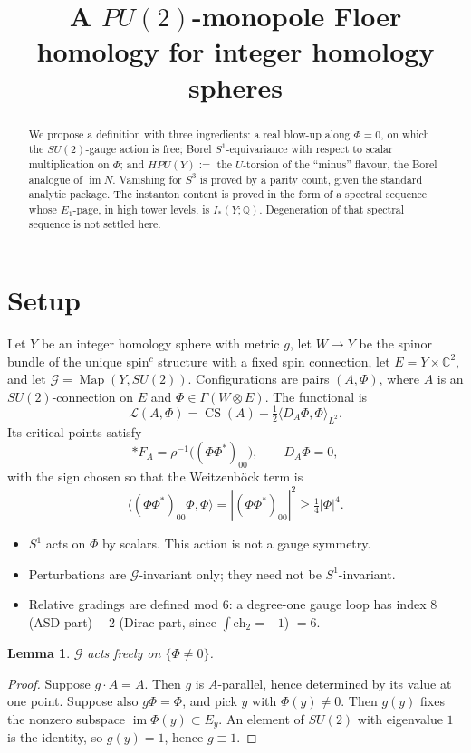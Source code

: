 \documentclass[11pt]{amsart}
\title{A $PU(2)$-monopole Floer homology for integer homology spheres}
\date{}
\newtheorem{lemma}{Lemma}
\theoremstyle{definition}
\theoremstyle{remark}
\newcommand{\Q}{\mathbb{Q}}
\newcommand{\C}{\mathbb{C}}
\newcommand{\cG}{\mathcal{G}}
\newcommand{\cL}{\mathcal{L}}
\newcommand{\HPU}{\mathit{HPU}}
\DeclareMathOperator{\CS}{CS}
\DeclareMathOperator{\im}{im}
\DeclareMathOperator{\Map}{Map}
\begin{document}
\begin{abstract}
We propose a definition with three ingredients: a real blow-up along
$\Phi=0$, on which the $SU(2)$-gauge action is free; Borel
$S^1$-equivariance with respect to scalar multiplication on $\Phi$; and
$\HPU(Y):=$ the $U$-torsion of the ``minus'' flavour, the Borel analogue
of $\im N$. Vanishing for $S^3$ is proved by a parity count, given the
standard analytic package. The instanton content is proved in the form of
a spectral sequence whose $E_1$-page, in high tower levels, is
$I_*(Y;\Q)$. Degeneration of that spectral sequence is not settled here.
\end{abstract}

\maketitle

\section{Setup}

Let $Y$ be an integer homology sphere with metric $g$, let $W\to Y$ be the
spinor bundle of the unique spin$^c$ structure with a fixed spin
connection, let $E=Y\times\C^2$, and let $\cG=\Map(Y,SU(2))$.
Configurations are pairs $(A,\Phi)$, where $A$ is an $SU(2)$-connection on
$E$ and $\Phi\in\Gamma(W\otimes E)$. The functional is
\[
\cL(A,\Phi)=\CS(A)+\tfrac12\langle D_A\Phi,\Phi\rangle_{L^2}.
\]
Its critical points satisfy
\[
\ast F_A=\rho^{-1}\big((\Phi\Phi^*)_{00}\big),\qquad D_A\Phi=0,
\]
with the sign chosen so that the Weitzenb\"ock term is
\[
\langle(\Phi\Phi^*)_{00}\Phi,\Phi\rangle=|(\Phi\Phi^*)_{00}|^2\ge\tfrac14|\Phi|^4.
\]
\begin{itemize}[leftmargin=*]
\item $S^1$ acts on $\Phi$ by scalars. This action is not a gauge symmetry.
\item Perturbations are $\cG$-invariant only; they need not be
  $S^1$-invariant.
\item Relative gradings are defined mod $6$: a degree-one gauge loop has
  index $8$ (ASD part) $-\,2$ (Dirac part, since $\int\mathrm{ch}_2=-1$)
  $=6$.
\end{itemize}

\begin{lemma}\label{lem:free}
$\cG$ acts freely on $\{\Phi\neq0\}$.
\end{lemma}

\begin{proof}
Suppose $g\cdot A=A$. Then $g$ is $A$-parallel, hence determined by its
value at one point. Suppose also $g\Phi=\Phi$, and pick $y$ with
$\Phi(y)\neq0$. Then $g(y)$ fixes the nonzero subspace
$\im\Phi(y)\subset E_y$. An element of $SU(2)$ with eigenvalue $1$ is the
identity, so $g(y)=1$, hence $g\equiv1$.
\end{proof}
\end{document}
